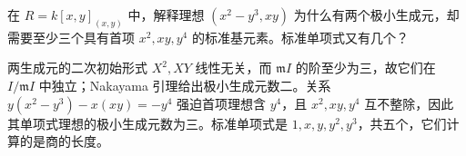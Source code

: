 \begin{exercise}\label{b3:ex:F-minimal-standard}
	在 \(R=k[x,y]_{(x,y)}\) 中，解释理想 \((x^2-y^3,xy)\) 为什么有两个极小生成元，却需要至少三个具有首项 \(x^2,xy,y^4\) 的标准基元素。标准单项式又有几个？
\end{exercise}
\begin{solution}
	两生成元的二次初始形式 \(X^2,XY\) 线性无关，而 \(\mathfrak m I\) 的阶至少为三，故它们在 \(I/\mathfrak m I\) 中独立；Nakayama 引理给出极小生成元数二。关系 \(y(x^2-y^3)-x(xy)=-y^4\) 强迫首项理想含 \(y^4\)，且 \(x^2,xy,y^4\) 互不整除，因此其单项式理想的极小生成元数为三。标准单项式是 \(1,x,y,y^2,y^3\)，共五个，它们计算的是商的长度。
\end{solution}
